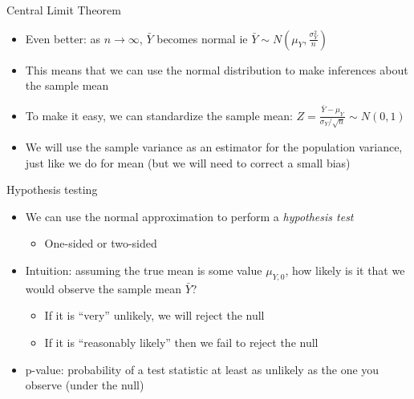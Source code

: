 \documentclass[aspectratio=169]{beamer}
\begin{document}
\begin{frame}{Central Limit Theorem}
    \begin{itemize}
        \item Even better: as $n \to \infty$, $\bar{Y}$ becomes normal ie $\bar{Y} \sim N(\mu_Y,\frac{\sigma_Y^2}{n})$
        \item This means that we can use the normal distribution to make inferences about the sample mean
        \item To make it easy, we can standardize the sample mean: $Z = \frac{\bar{Y} - \mu_Y}{\sigma_Y/\sqrt{n}} \sim N(0,1)$
        \item We will use the sample variance as an estimator for the population variance, just like we do for mean (but we will need to correct a small bias)
    \end{itemize}
\end{frame}

\begin{frame}{Hypothesis testing}
    \begin{itemize}
        \item We can use the normal approximation to perform a \textit{hypothesis test}
        \begin{itemize}
            \item One-sided or two-sided
        \end{itemize}
        \item Intuition: assuming the true mean is some value $\mu_{Y,0}$, how likely is it that we would observe the sample mean $\bar{Y}$?
        \begin{itemize}
            \item If it is ``very'' unlikely, we will reject the null
            \item If it is ``reasonably likely'' then we fail to reject the null
        \end{itemize}
        \item p-value: probability of a test statistic at least as unlikely as the one you observe (under the null)
    \end{itemize}
\end{frame}
\end{document}
